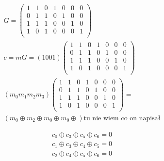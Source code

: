\documentclass[12pt]{article}
\begin{document}
\begin{align*}
    G=
    \begin{pmatrix}
        1 & 1 & 0 & 1 & 0  & 0 & 0 \\
        0 & 1 & 1 & 0 & 1  & 0 & 0 \\
        1 & 1 & 1 & 0 & 0  & 1 & 0\\
        1 & 0 & 1 & 0 & 0  & 0 & 1\\
    \end{pmatrix} \\
    c= mG =(1001)
    \begin{pmatrix}
        1 & 1 & 0 & 1 & 0  & 0 & 0 \\
        0 & 1 & 1 & 0 & 1  & 0 & 0 \\
        1 & 1 & 1 & 0 & 0  & 1 & 0\\
        1 & 0 & 1 & 0 & 0  & 0 & 1\\
    \end{pmatrix} \\
    (m_0m_1m_2m_3)
    \begin{pmatrix}
        1 & 1 & 0 & 1 & 0  & 0 & 0 \\
        0 & 1 & 1 & 0 & 1  & 0 & 0 \\
        1 & 1 & 1 & 0 & 0  & 1 & 0\\
        1 & 0 & 1 & 0 & 0  & 0 & 1\\
    \end{pmatrix} = \\  (m_0 \oplus m_2 \oplus m_0 \oplus m_0 \oplus) \text{tu nie wiem co on napisał}
\end{align*}


\begin{align*}
   c_0 \oplus c_3 \oplus c_5 \oplus c_6 = 0 \\
   c_1 \oplus c_3 \oplus c_4 \oplus c_5 = 0 \\
   c_2 \oplus c_4 \oplus c_5 \oplus c_6 = 0 \\
\end{align*}
\end{document}
